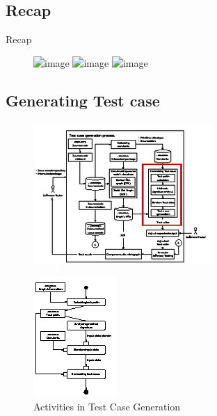 \documentclass{beamer}
\begin{document}
\subsection{Recap}
\begin{frame}{Recap}
    \begin{figure}
        \includegraphics<1>[height=0.8\paperheight]{figure/1st-phase-1}
        \includegraphics<2>[height=0.8\paperheight]{figure/1st-phase-2}
        \includegraphics<3>[height=0.8\paperheight]{figure/1st-phase-3}
    \end{figure}
\end{frame}

\subsection{Generating Test case}
\begin{frame}
    \begin{figure}
        \includegraphics[height=0.8\paperheight]{figure/Methodology-Highlight-1}
    \end{figure}
\end{frame}

\begin{frame}
    \begin{figure}
        \includegraphics[height=.8\paperheight]{figure/Activities}
        \caption{Activities in Test Case Generation}
        \label{fig:testcasegenearation}
    \end{figure}
\end{frame}
\end{document}

